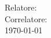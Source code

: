 \newpage 
\pagestyle{empty}
\begin{center}
\Large\textbf{\fontsize{30}{30}\selectfont{\\ \vspace{170pt} \ttitle}}\\
\vspace{30pt}
\textbf{\candidatename}\\
Relatore: \textbf{\fstsupname}\\
Correlatore: \textbf{\sndsupname}\\
\vspace{10cm}
\today
\end{center}
\clearpage